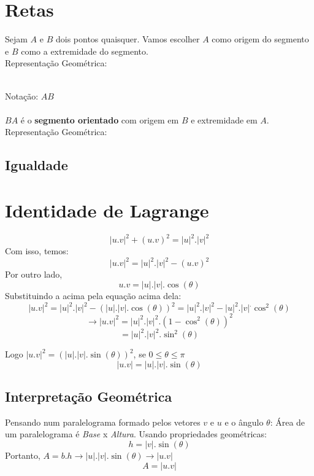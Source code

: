 \documentclass[ ]{article}
\begin{document}
	\section{Retas}
		Sejam $A$ e $B$ dois pontos quaisquer. Vamos escolher $A$ como origem do segmento e $B$ como a extremidade do segmento.\\
		Representação Geométrica:
		\\
		Notação: $AB$\\ \\
		$BA$ é o \textbf{segmento orientado} com origem em $B$ e extremidade em $A$.\\
		Representação Geométrica:
		\subsection{Igualdade}
	\newpage %
	\section{Identidade de Lagrange}
		$$|u.v|^2 +(u.v)^2=|u|^2.|v|^2$$
		Com isso, temos:
		$$|u.v|^2=|u|^2.|v|^2-(u.v)^2$$
		Por outro lado,
		$$u.v=|u|.|v|.\cos(\theta)$$
		Substituindo a acima pela equação acima dela:
		$$|u.v|^2=|u|^2.|v|^2-(|u|.|v|.\cos(\theta))^2=|u|^2.|v|^2-|u|^2.|v|^.\cos^2(\theta)$$
		$$\to |u.v|^2 = |u|^2.|v|^2.(1-\cos^2(\theta))^2$$
		$$=|u|^2.|v|^2.\sin^2(\theta)$$
		
		Logo $|u.v|^2 = (|u|.|v|.\sin(\theta))^2$, se $0 \leq \theta \leq \pi$
		$$|u.v| = |u|.|v|.\sin(\theta)$$ %
		
		
		\subsection{Interpretação Geométrica}
			Pensando num paralelograma formado pelos vetores $v$ e $u$ e o ângulo $\theta$:
			Área de um paralelograma é \textit{Base} x \textit{Altura}. Usando propriedades geométricas:
			$$h=|v|.\sin(\theta)$$
			Portanto, $A=b.h \to |u|.|v|.\sin(\theta)\to |u.v|$
			$$A=|u.v|$$%
			
\end{document}
